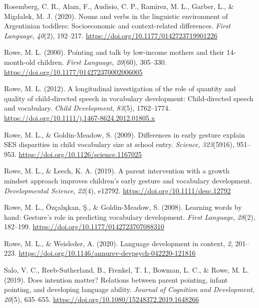 \documentclass[
  english,
  man,floatsintext]{apa6}
\begin{document}
\leavevmode\hypertarget{ref-rosemberg_nouns_2020}{}%
Rosemberg, C. R., Alam, F., Audisio, C. P., Ramirez, M. L., Garber, L., \& Migdalek, M. J. (2020). Nouns and verbs in the linguistic environment of Argentinian toddlers: Socioeconomic and context-related differences. \emph{First Language}, \emph{40}(2), 192--217. \url{https://doi.org/10.1177/0142723719901226}

\leavevmode\hypertarget{ref-rowe_pointing_2000}{}%
Rowe, M. L. (2000). Pointing and talk by low-income mothers and their 14-month-old children. \emph{First Language}, \emph{20}(60), 305--330. \url{https://doi.org/10.1177/014272370002006005}

\leavevmode\hypertarget{ref-rowe_longitudinal_2012}{}%
Rowe, M. L. (2012). A longitudinal investigation of the role of quantity and quality of child-directed speech in vocabulary development: Child-directed speech and vocabulary. \emph{Child Development}, \emph{83}(5), 1762--1774. \url{https://doi.org/10.1111/j.1467-8624.2012.01805.x}

\leavevmode\hypertarget{ref-rowe_differences_2009}{}%
Rowe, M. L., \& Goldin-Meadow, S. (2009). Differences in early gesture explain SES disparities in child vocabulary size at school entry. \emph{Science}, \emph{323}(5916), 951--953. \url{https://doi.org/10.1126/science.1167025}

\leavevmode\hypertarget{ref-rowe_parent_2019}{}%
Rowe, M. L., \& Leech, K. A. (2019). A parent intervention with a growth mindset approach improves children's early gesture and vocabulary development. \emph{Developmental Science}, \emph{22}(4), e12792. \url{https://doi.org/10.1111/desc.12792}

\leavevmode\hypertarget{ref-rowe_learning_2008}{}%
Rowe, M. L., Özçalışkan, Ş., \& Goldin-Meadow, S. (2008). Learning words by hand: Gesture's role in predicting vocabulary development. \emph{First Language}, \emph{28}(2), 182--199. \url{https://doi.org/10.1177/0142723707088310}

\leavevmode\hypertarget{ref-rowe_language_2020}{}%
Rowe, M. L., \& Weisleder, A. (2020). Language development in context, \emph{2}, 201--223. \url{https://doi.org/10.1146/annurev-devpsych-042220-121816}

\leavevmode\hypertarget{ref-salo_does_2019}{}%
Salo, V. C., Reeb-Sutherland, B., Frenkel, T. I., Bowman, L. C., \& Rowe, M. L. (2019). Does intention matter? Relations between parent pointing, infant pointing, and developing language ability. \emph{Journal of Cognition and Development}, \emph{20}(5), 635--655. \url{https://doi.org/10.1080/15248372.2019.1648266}
\end{document}
